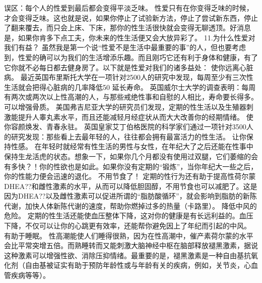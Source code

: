 \documentclass[12pt,UTF8]{ctexbook}
\begin{document}
误区：每个人的性爱到最后都会变得平淡乏味。
性爱只有在你变得乏味的时候，才会变得乏味。这也就是说，如果你停止了试验新方法，停止了尝试新东西，停止了翻来覆去，而只会上床、下床，那你的性生活很快就会变得无聊透顶。好消息是，如果你肯多下点工夫，你未来的性生活便又会大放异彩了。
11.为什么性爱对我们有益？
虽然我是第一个说“性爱不是生活中最重要的事”的人，但也要考虑到，性爱的确可以为我们的生活增添乐趣。而且刚巧它还有利于身体和健康，有了它你就不必每日都去健身房了。以下就是性爱对我们的诸多益处：
使你远离心脏病。
最近英国布里斯托大学在一项针对2500人的研究中发现，每周至少有三次性生活就会把得心脏病的几率降低50%
延长寿命。
英国威尔士大学的调查表明：每周有两次或两次以上性高潮的人，与那些戒绝性事和自慰的人相比，寿命要长得多。
可以增强骨质。
美国弗吉尼亚大学的研究员们发现，定期的性生活以及生殖器刺激能提升人睾丸素水平，而且还能减轻月经症状从而大大改善你的经期情绪。
使你容颜焕发、青春永驻。
英国皇家艾丁伯格医院的科学家们通过一项针对3500人的研究发现：那些看上去最年轻的人，往往都会拥有最富活力的性生活。
让你保持性感。
在年轻时就经常有性生活的男性与女性，在年纪大了之后还能在性事中保持生龙活虎的状态。想象一下，如果你几个月都没有使用过双腿，它们萎缩的会有多快？！你的性欲也是如此。如果你没有定期的“锻炼”，当你年纪大一些之后，你的性能力便会迅速的退化。
不用节食了！
定期的性行为还有助于提高性荷尔蒙DHEA??和雌性激素的水平，从而可以降低胆固醇，不用节食也可以减肥了。这是因为DHEA??以及雌性激素可以促进所谓的“脂肪酸循环”，就会影响到脂肪的新陈代谢，加快人体新陈代谢的速度，帮助你燃掉过多的热量（卡路里）。
降低中风的危险。
定期的性生活还能使血压整体下降，这对你的健康是有长远利益的。血压下降，不仅可以让你的心跳更有效率，还能帮你避免因上了年纪而引起的中风。
有助于睡眠。
性高潮能使人们睡得很熟，因为在性高潮中，催产素荷尔蒙的水平会比平常突增五倍。而熟睡转而又能刺激大脑神经中枢在脑部释放褪黑激素，据说这种激素可以增强性欲、消除压抑情绪。最重要的是，褪黑激素是一种自由基抗氧化剂（自由基被证实有助于预防年龄性或与年龄有关的疾病，例如，关节炎，心血管疾病等等）。
\end{document}
